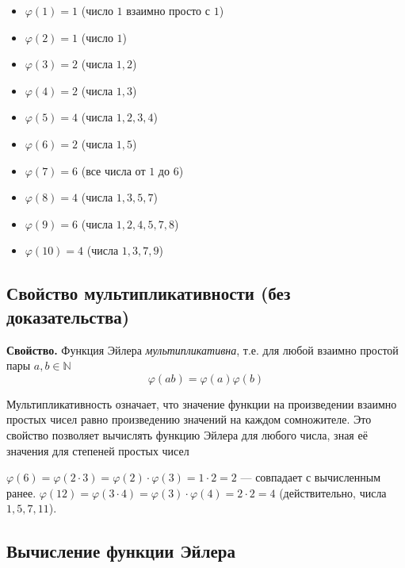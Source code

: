 \documentclass[a4paper,12pt]{article}
\theoremstyle{definition}
\theoremstyle{plain}
\theoremstyle{remark}
\begin{document}
	\begin{tcolorbox}[colback=gray!5, colframe=gray!50, title=Примеры]
		\begin{itemize}
			\item $\varphi(1) = 1$ (число $1$ взаимно просто с $1$)
			\item $\varphi(2) = 1$ (число $1$)
			\item $\varphi(3) = 2$ (числа $1,2$)
			\item $\varphi(4) = 2$ (числа $1,3$)
			\item $\varphi(5) = 4$ (числа $1,2,3,4$)
			\item $\varphi(6) = 2$ (числа $1,5$)
			\item $\varphi(7) = 6$ (все числа от $1$ до $6$)
			\item $\varphi(8) = 4$ (числа $1,3,5,7$)
			\item $\varphi(9) = 6$ (числа $1,2,4,5,7,8$)
			\item $\varphi(10) = 4$ (числа $1,3,7,9$)
		\end{itemize}
	\end{tcolorbox}
	
	\subsection{Свойство мультипликативности (без доказательства)}
	
	\noindent \textbf{Свойство.}
	Функция Эйлера \textit{мультипликативна}, т.е. для любой взаимно простой пары $a, b \in \mathbb{N}$
	\[
	\varphi(ab) = \varphi(a) \varphi(b)
	\]
	
	\begin{tcolorbox}[colback=green!5, colframe=green!50!black, title=Пояснение]
		Мультипликативность означает, что значение функции на произведении взаимно простых чисел равно произведению значений на каждом сомножителе. Это свойство позволяет вычислять функцию Эйлера для любого числа, зная её значения для степеней простых чисел
	\end{tcolorbox}
	
	\begin{tcolorbox}[colback=blue!5, colframe=blue!40!black, title=Пример]
		$\varphi(6) = \varphi(2 \cdot 3) = \varphi(2) \cdot \varphi(3) = 1 \cdot 2 = 2$ — совпадает с вычисленным ранее.
		$\varphi(12) = \varphi(3 \cdot 4) = \varphi(3) \cdot \varphi(4) = 2 \cdot 2 = 4$ (действительно, числа $1,5,7,11$).
	\end{tcolorbox}
	
	\subsection{Вычисление функции Эйлера}
	
\end{document}
